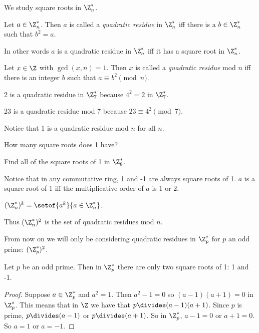 \documentclass[oneside,12pt]{amsart}
\begin{document}
We study square roots in $\Z^*_n$.

\begin{definition}
Let $a\in\Z^*_n$. Then $a$ is called a \emph{quadratic residue} in $\Z^*_n$ iff there is a $b\in\Z^*_n$ such that $b^2 = a$.

In other words $a$ is a quadratic residue in $\Z^*_n$ iff it has a square root in $\Z^*_n$.

Let $x\in\Z$ with $\gcd(x,n) = 1$. Then $x$ is called a \emph{quadratic residue} mod $n$ iff there is an integer $b$ such that
$a\equiv b^2 \pmod n$.
\end{definition}

\begin{example}
2 is a quadratic residue in $\Z^*_7$ because $4^2 = 2$ in $\Z^*_7$.

23 is a quadratic residue mod 7 because $23 \equiv 4^2 \pmod 7$.
\end{example}

Notice that 1 is a quadratic residue mod $n$ for all $n$.

\begin{question}
How many square roots does 1 have?
\end{question}

\begin{in_class_example}
Find all of the square roots of 1 in $\Z^*_8$.
\end{in_class_example}

Notice that in any commutative ring, 1 and -1 are always square roots of 1.
$a$ is a square root of 1 iff the multiplicative order of $a$ is 1 or 2.

\begin{definition}
$(\Z^*_n)^k = \setof{a^k}{a\in\Z^*_n}$.
\end{definition}

Thus $(\Z^*_n)^2$ is the set of quadratic residues mod $n$.

From now on we will only be considering quadratic residues in $\Z^*_p$ for $p$ an odd prime: $(\Z^*_p)^2$.

\begin{lemma}
Let $p$ be an odd prime. Then in $\Z^*_p$ there are only two square roots of 1: 1 and -1.
\end{lemma}
\begin{proof}
Suppose $a\in\Z^*_p$ and $a^2=1$. Then $a^2 - 1 = 0$ so $(a-1)(a+1) = 0$ in $\Z^*_p$. This means that
in $\Z$ we have that $p\divides (a-1)(a+1)$. Since $p$ is prime, $p\divides (a-1)$ or $p\divides (a+1)$.
So in $\Z^*_p$, $a-1=0$ or $a+1=0$. So $a=1$ or $a=-1$.
\end{proof}
\end{document}
